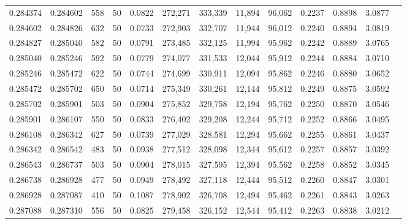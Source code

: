 \begin{tabular}{rrrrrrrrrrrrr}
0.284374 & 0.284602 &   558 &  50 &                                     0.0822 & 272,271 & 333,339 &  11,894 &  96,062 & 0.2237 & 0.8898 & 3.0877 \\
0.284602 & 0.284826 &   632 &  50 &                                     0.0733 & 272,903 & 332,707 &  11,944 &  96,012 & 0.2240 & 0.8894 & 3.0819 \\
0.284827 & 0.285040 &   582 &  50 &                                     0.0791 & 273,485 & 332,125 &  11,994 &  95,962 & 0.2242 & 0.8889 & 3.0765 \\
0.285040 & 0.285246 &   592 &  50 &                                     0.0779 & 274,077 & 331,533 &  12,044 &  95,912 & 0.2244 & 0.8884 & 3.0710 \\
0.285246 & 0.285472 &   622 &  50 &                                     0.0744 & 274,699 & 330,911 &  12,094 &  95,862 & 0.2246 & 0.8880 & 3.0652 \\
0.285472 & 0.285702 &   650 &  50 &                                     0.0714 & 275,349 & 330,261 &  12,144 &  95,812 & 0.2249 & 0.8875 & 3.0592 \\
0.285702 & 0.285901 &   503 &  50 &                                     0.0904 & 275,852 & 329,758 &  12,194 &  95,762 & 0.2250 & 0.8870 & 3.0546 \\
0.285901 & 0.286107 &   550 &  50 &                                     0.0833 & 276,402 & 329,208 &  12,244 &  95,712 & 0.2252 & 0.8866 & 3.0495 \\
0.286108 & 0.286342 &   627 &  50 &                                     0.0739 & 277,029 & 328,581 &  12,294 &  95,662 & 0.2255 & 0.8861 & 3.0437 \\
0.286342 & 0.286542 &   483 &  50 &                                     0.0938 & 277,512 & 328,098 &  12,344 &  95,612 & 0.2257 & 0.8857 & 3.0392 \\
0.286543 & 0.286737 &   503 &  50 &                                     0.0904 & 278,015 & 327,595 &  12,394 &  95,562 & 0.2258 & 0.8852 & 3.0345 \\
0.286738 & 0.286928 &   477 &  50 &                                     0.0949 & 278,492 & 327,118 &  12,444 &  95,512 & 0.2260 & 0.8847 & 3.0301 \\
0.286928 & 0.287087 &   410 &  50 &                                     0.1087 & 278,902 & 326,708 &  12,494 &  95,462 & 0.2261 & 0.8843 & 3.0263 \\
0.287088 & 0.287310 &   556 &  50 &                                     0.0825 & 279,458 & 326,152 &  12,544 &  95,412 & 0.2263 & 0.8838 & 3.0212 \\

\end{tabular}
